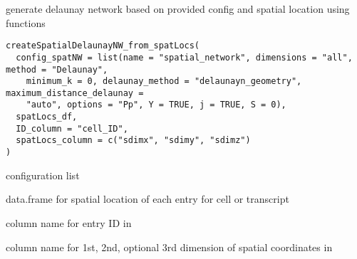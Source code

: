 \documentclass[letterpaper]{book}
\begin{document}
%
\begin{Description}
generate delaunay network based on provided config and spatial location using  functions
\end{Description}
%
\begin{Usage}
\begin{verbatim}
createSpatialDelaunayNW_from_spatLocs(
  config_spatNW = list(name = "spatial_network", dimensions = "all", method = "Delaunay",
    minimum_k = 0, delaunay_method = "delaunayn_geometry", maximum_distance_delaunay =
    "auto", options = "Pp", Y = TRUE, j = TRUE, S = 0),
  spatLocs_df,
  ID_column = "cell_ID",
  spatLocs_column = c("sdimx", "sdimy", "sdimz")
)
\end{verbatim}
\end{Usage}
%
\begin{Arguments}
\begin{ldescription}
\item[\code{config\_spatNW}] configuration list

\item[\code{spatLocs\_df}] data.frame for spatial location of each entry for cell or transcript

\item[\code{ID\_column}] column name for entry ID in 

\item[\code{spatLocs\_column}] column name for 1st, 2nd, optional 3rd dimension of spatial coordinates in 
\end{ldescription}
\end{Arguments}
%
\end{document}
